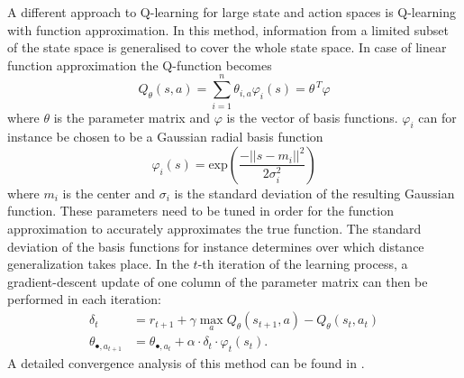 \documentclass[../main.tex]{subfiles}
\begin{document}
A different approach to Q-learning for large state and action spaces is Q-learning with function approximation. In this method, information from a limited subset of the state space is generalised to cover the whole state space.  In case of linear function approximation the Q-function becomes
\begin{equation}
Q_\theta(s,a) = \sum_{i=1}^n \theta_{i,a}\varphi_i(s) = {\theta}^{\,T} \varphi
\end{equation}
where $\theta$ is the parameter matrix and $\varphi$ is the vector of basis functions. $\varphi_i$ can for instance be chosen to be a Gaussian radial basis function
\begin{equation}
\varphi_i(s) = \text{exp}\left(\dfrac{-||s-m_i||^2}{2\sigma_i^2}\right)
\end{equation}
where $m_i$ is the center and $\sigma_i$ is the standard deviation of the resulting Gaussian function. These parameters need to be tuned in order for the function approximation to accurately approximates the true function. The standard deviation of the basis functions for instance determines over which distance generalization takes place. In the $t$-th iteration of the learning process, a gradient-descent update of one column of the parameter matrix can then be performed in each iteration:
\begin{align}
\delta_t &= r_{t+1} + \gamma \max_a Q_\theta(s_{t+1},a) - Q_\theta(s_{t},a_t)\\
\theta_{\bullet,a_{t+1}} &= \theta_{\bullet,a_{t}} + \alpha \cdot \delta_t  \cdot \varphi_t(s_t).
\end{align}
A detailed convergence analysis of this method can be found in \cite{tsitsiklis1997analysis}.
\end{document}
